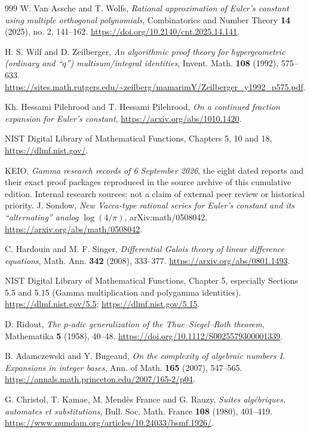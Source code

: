 \documentclass[11pt,a4paper]{article}
\theoremstyle{definition}
\theoremstyle{remark}
\numberwithin{equation}{section}
\begin{document}
\begin{thebibliography}{999}
W. Van Assche and T. Wolfs,
\emph{Rational approximation of Euler's constant using multiple
orthogonal polynomials},
Combinatorics and Number Theory \textbf{14} (2025), no. 2, 141--162.
\url{https://doi.org/10.2140/cnt.2025.14.141}.

H. S. Wilf and D. Zeilberger,
\emph{An algorithmic proof theory for hypergeometric (ordinary and
``$q$'') multisum/integral identities},
Invent. Math. \textbf{108} (1992), 575--633.
\url{https://sites.math.rutgers.edu/~zeilberg/mamarimY/Zeilberger_y1992_p575.pdf}.

Kh. Hessami Pilehrood and T. Hessami Pilehrood,
\emph{On a continued fraction expansion for Euler's constant},
\url{https://arxiv.org/abs/1010.1420}.

NIST Digital Library of Mathematical Functions, Chapters 5, 10 and 18,
\url{https://dlmf.nist.gov/}.

KEIO, \emph{Gamma research records of 6 September 2026},
the eight dated reports and their exact proof packages reproduced in the
source archive of this cumulative edition.  Internal research sources;
not a claim of external peer review or historical priority.
J. Sondow, \emph{New Vacca-type rational series for Euler's constant and
its ``alternating'' analog $\log(4/\pi)$}, arXiv:math/0508042.
\url{https://arxiv.org/abs/math/0508042}.

C. Hardouin and M. F. Singer, \emph{Differential Galois theory of linear
difference equations}, Math. Ann. \textbf{342} (2008), 333--377.
\url{https://arxiv.org/abs/0801.1493}.

NIST Digital Library of Mathematical Functions, Chapter 5, especially
Sections 5.5 and 5.15 (Gamma multiplication and polygamma identities).
\url{https://dlmf.nist.gov/5.5}; \url{https://dlmf.nist.gov/5.15}.

D. Ridout, \emph{The $p$-adic generalization of the Thue--Siegel--Roth
theorem}, Mathematika \textbf{5} (1958), 40--48.
\url{https://doi.org/10.1112/S0025579300001339}.

B. Adamczewski and Y. Bugeaud, \emph{On the complexity of algebraic
numbers I. Expansions in integer bases}, Ann. of Math. \textbf{165}
(2007), 547--565.
\url{https://annals.math.princeton.edu/2007/165-2/p04}.

G. Christol, T. Kamae, M. Mend\`es France and G. Rauzy,
\emph{Suites alg\'ebriques, automates et substitutions},
Bull. Soc. Math. France \textbf{108} (1980), 401--419.
\url{https://www.numdam.org/articles/10.24033/bsmf.1926/}.


\end{thebibliography}
\end{document}
